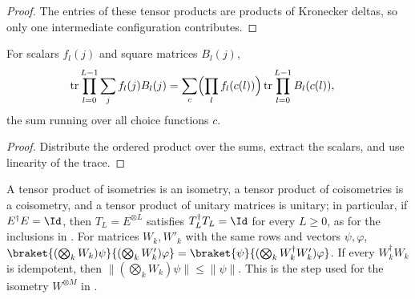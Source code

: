 \begin{proof}
    \leanok
    The entries of these tensor products are products of Kronecker deltas, so
    only one intermediate configuration contributes.
\end{proof}

\begin{lemma}
    \label{lem:elementary_trace_product_sums}
    \leanok
    For scalars $f_l(j)$ and square matrices $B_l(j)$,
    \begin{align}
        \operatorname{tr}\prod_{l=0}^{L-1}\sum_jf_l(j)B_l(j)
         & =\sum_{c}\Bigl(\prod_lf_l(c(l))\Bigr)
        \operatorname{tr}\prod_{l=0}^{L-1}B_l(c(l)),
        \notag
    \end{align}
    the sum running over all choice functions $c$.
\end{lemma}

\begin{proof}
    \leanok
    Distribute the ordered product over the sums, extract the scalars, and
    use linearity of the trace.
\end{proof}

\begin{lemma}
    \label{lem:elementary_tensor_power_partial_isometry}
    \leanok
    A tensor product of isometries is an isometry, a tensor product of
    coisometries is a coisometry, and a tensor product of unitary matrices is
    unitary; in particular, if $E^\dagger E=\Id$, then $T_L=E^{\otimes L}$
    satisfies $T_L^\dagger T_L=\Id$ for every $L\ge0$, as for the inclusions
    in \cite[Section~II.F.2]{Schuch2011Phases}. For matrices $W_k,W'_k$ with
    the same rows and vectors $\psi,\varphi$,
    $\braket{(\bigotimes_kW_k)\psi}{(\bigotimes_kW'_k)\varphi}
        =\braket{\psi}{(\bigotimes_kW_k^\dagger W'_k)\varphi}$. If every
    $W_k^\dagger W_k$ is idempotent, then
    $\lVert(\bigotimes_kW_k)\psi\rVert\leq\lVert\psi\rVert$. This is the step
    used for the isometry $W^{\otimes M}$ in
    \cite[eq.~(19)]{Malz2024Preparation}.
\end{lemma}

